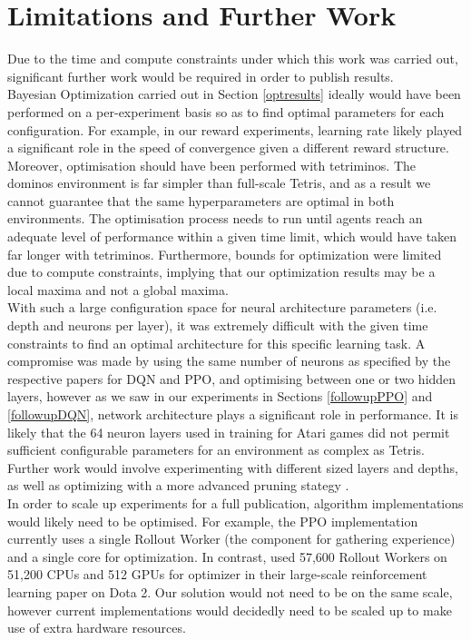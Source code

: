 \documentclass[12pt]{article}
\begin{document}
\section{Limitations and Further Work}\label{limits}
Due to the time and compute constraints under which this work was carried out, significant further work would be required in order to publish results. \\\newline
Bayesian Optimization carried out in Section \ref{optresults} ideally would have been performed on a per-experiment basis so as to find optimal parameters for each configuration. For example, in our reward experiments, learning rate likely played a significant role in the speed of convergence given a different reward structure. Moreover, optimisation should have been performed with tetriminos. The dominos environment is far simpler than full-scale Tetris, and as a result we cannot guarantee that the same hyperparameters are optimal in both environments. The optimisation process needs to run until agents reach an adequate level of performance within a given time limit, which would have taken far longer with tetriminos. Furthermore, bounds for optimization were limited due to compute constraints, implying that our optimization results may be a local maxima and not a global maxima. \\\newline 
With such a large configuration space for neural architecture parameters (i.e. depth and neurons per layer), it was extremely difficult with the given time constraints to find an optimal architecture for this specific learning task. A compromise was made by using the same number of neurons as specified by the respective papers for DQN and PPO, and optimising between one or two hidden layers, however as we saw in our experiments in Sections \ref{followupPPO} and \ref{followupDQN}, network architecture plays a significant role in performance. It is likely that the 64 neuron layers used in training for Atari games did not permit sufficient configurable parameters for an environment as complex as Tetris. Further work would involve experimenting with different sized layers and depths, as well as optimizing with a more advanced pruning stategy \autocite{248452}.\\\newline
In order to scale up experiments for a full publication, algorithm implementations would likely need to be optimised. For example, the PPO implementation currently uses a single Rollout Worker (the component for gathering experience) and a single core for optimization. In contrast, \textcite{DBLP:journals/corr/abs-1912-06680} used 57,600 Rollout Workers on 51,200 CPUs and 512 GPUs for optimizer in their large-scale reinforcement learning paper on Dota 2. Our solution would not need to be on the same scale, however current implementations would decidedly need to be scaled up to make use of extra hardware resources. \\\newline
\end{document}
